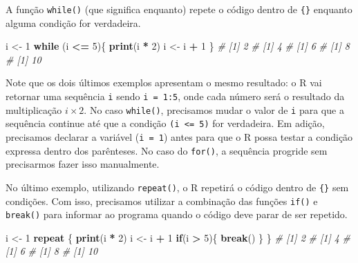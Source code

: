 \documentclass[
]{book}
\newenvironment{Shaded}{\begin{snugshade}}{\end{snugshade}}
\newcommand{\CommentTok}[1]{\textcolor[rgb]{0.56,0.35,0.01}{\textit{#1}}}
\newcommand{\ControlFlowTok}[1]{\textcolor[rgb]{0.13,0.29,0.53}{\textbf{#1}}}
\newcommand{\DecValTok}[1]{\textcolor[rgb]{0.00,0.00,0.81}{#1}}
\newcommand{\KeywordTok}[1]{\textcolor[rgb]{0.13,0.29,0.53}{\textbf{#1}}}
\newcommand{\NormalTok}[1]{#1}
\newcommand{\OperatorTok}[1]{\textcolor[rgb]{0.81,0.36,0.00}{\textbf{#1}}}
\newcommand{\StringTok}[1]{\textcolor[rgb]{0.31,0.60,0.02}{#1}}
\begin{document}
A função \texttt{while()} (que significa enquanto) repete o código dentro de \texttt{\{\}} enquanto alguma condição for verdadeira.

\begin{Shaded}
\begin{Highlighting}[]
\NormalTok{i <-}\StringTok{ }\DecValTok{1}
\ControlFlowTok{while}\NormalTok{ (i }\OperatorTok{<=}\StringTok{ }\DecValTok{5}\NormalTok{)\{}
  \KeywordTok{print}\NormalTok{(i }\OperatorTok{*}\StringTok{ }\DecValTok{2}\NormalTok{)}
\NormalTok{  i <-}\StringTok{ }\NormalTok{i }\OperatorTok{+}\StringTok{ }\DecValTok{1}
\NormalTok{\}}
\CommentTok{# [1] 2}
\CommentTok{# [1] 4}
\CommentTok{# [1] 6}
\CommentTok{# [1] 8}
\CommentTok{# [1] 10}
\end{Highlighting}
\end{Shaded}

Note que os dois últimos exemplos apresentam o mesmo resultado: o R vai retornar uma sequência \texttt{i} sendo \texttt{i\ =\ 1:5}, onde cada número será o resultado da multiplicação \(i \times 2\). No caso \texttt{while()}, precisamos mudar o valor de \texttt{i} para que a sequência continue até que a condição \texttt{(i\ \textless{}=\ 5)} for verdadeira. Em adição, precisamos declarar a variável (\texttt{i\ =\ 1}) antes para que o R possa testar a condição expressa dentro dos parênteses. No caso do \texttt{for()}, a sequência progride sem precisarmos fazer isso manualmente.

No último exemplo, utilizando \texttt{repeat()}, o R repetirá o código dentro de \texttt{\{\}} sem condições. Com isso, precisamos utilizar a combinação das funções \texttt{if()} e \texttt{break()} para informar ao programa quando o código deve parar de ser repetido.

\begin{Shaded}
\begin{Highlighting}[]
\NormalTok{i <-}\StringTok{ }\DecValTok{1}
\ControlFlowTok{repeat}\NormalTok{ \{}
  \KeywordTok{print}\NormalTok{(i }\OperatorTok{*}\StringTok{ }\DecValTok{2}\NormalTok{)}
\NormalTok{  i <-}\StringTok{ }\NormalTok{i }\OperatorTok{+}\StringTok{ }\DecValTok{1}
  \ControlFlowTok{if}\NormalTok{(i }\OperatorTok{>}\StringTok{ }\DecValTok{5}\NormalTok{)\{}
    \ControlFlowTok{break}\NormalTok{()}
\NormalTok{  \}}
\NormalTok{\}}
\CommentTok{# [1] 2}
\CommentTok{# [1] 4}
\CommentTok{# [1] 6}
\CommentTok{# [1] 8}
\CommentTok{# [1] 10}
\end{Highlighting}
\end{Shaded}
\end{document}
